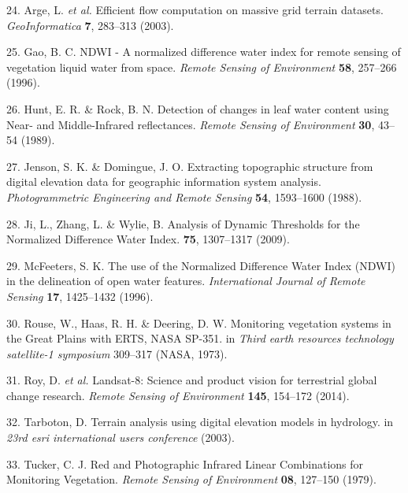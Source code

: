 \documentclass[12pt,oneside]{article}
\begin{document}
\leavevmode\hypertarget{ref-Arge_et_al_2003}{}%
24. Arge, L. \emph{et al.} Efficient flow computation on massive grid terrain datasets. \emph{GeoInformatica} \textbf{7}, 283--313 (2003).

\leavevmode\hypertarget{ref-Gao_1996}{}%
25. Gao, B. C. NDWI - A normalized difference water index for remote sensing of vegetation liquid water from space. \emph{Remote Sensing of Environment} \textbf{58}, 257--266 (1996).

\leavevmode\hypertarget{ref-Hunt_and_Rock_1989}{}%
26. Hunt, E. R. \& Rock, B. N. Detection of changes in leaf water content using Near- and Middle-Infrared reflectances. \emph{Remote Sensing of Environment} \textbf{30}, 43--54 (1989).

\leavevmode\hypertarget{ref-Jenson_and_Domingue_1988}{}%
27. Jenson, S. K. \& Domingue, J. O. Extracting topographic structure from digital elevation data for geographic information system analysis. \emph{Photogrammetric Engineering and Remote Sensing} \textbf{54}, 1593--1600 (1988).

\leavevmode\hypertarget{ref-Ji_et_al_2009}{}%
28. Ji, L., Zhang, L. \& Wylie, B. Analysis of Dynamic Thresholds for the Normalized Difference Water Index. \textbf{75}, 1307--1317 (2009).

\leavevmode\hypertarget{ref-McFeeters_1996}{}%
29. McFeeters, S. K. The use of the Normalized Difference Water Index (NDWI) in the delineation of open water features. \emph{International Journal of Remote Sensing} \textbf{17}, 1425--1432 (1996).

\leavevmode\hypertarget{ref-Rouse_et_al_1973}{}%
30. Rouse, W., Haas, R. H. \& Deering, D. W. Monitoring vegetation systems in the Great Plains with ERTS, NASA SP-351. in \emph{Third earth resources technology satellite-1 symposium} 309--317 (NASA, 1973).

\leavevmode\hypertarget{ref-Roy_et_al_2014}{}%
31. Roy, D. \emph{et al.} Landsat-8: Science and product vision for terrestrial global change research. \emph{Remote Sensing of Environment} \textbf{145}, 154--172 (2014).

\leavevmode\hypertarget{ref-Tarboton_2003}{}%
32. Tarboton, D. Terrain analysis using digital elevation models in hydrology. in \emph{23rd esri international users conference} (2003).

\leavevmode\hypertarget{ref-Tucker_1979}{}%
33. Tucker, C. J. Red and Photographic Infrared Linear Combinations for Monitoring Vegetation. \emph{Remote Sensing of Environment} \textbf{08}, 127--150 (1979).
\end{document}
